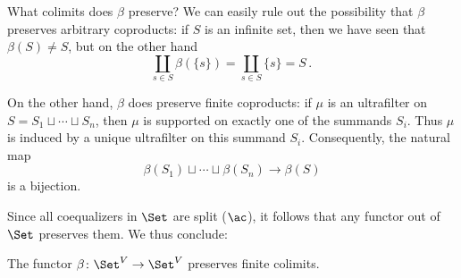 \begin{nul}
	What colimits does $ \beta $ preserve?
	We can easily rule out the possibility that
	$ \beta $ preserves arbitrary coproducts:
	if $ S $ is an infinite set, then
	we have seen that $ \beta(S) \neq S $, but
	on the other hand
	\[
		\coprod_{s \in S} \beta(\{s\}) =
		\coprod_{s \in S} \{s\} = S \period
	\]

	On the other hand, $ \beta $ does preserve finite coproducts:
	if $ \mu $ is an ultrafilter on
	$ S = S_1 \sqcup \cdots \sqcup S_n $,
	then $ \mu $ is supported on
	exactly one of the summands $ S_i $.
	Thus $ \mu $ is induced by a unique ultrafilter
	on this summand $ S_i $.
	Consequently, the natural map
	\[
		\beta(S_1) \sqcup \cdots \sqcup \beta(S_n) \to \beta(S)
	\]
	is a bijection.

	Since all coequalizers in $ \Set $ are split ($ \ac $),
	it follows that any functor out of $ \Set $ preserves them.
	We thus conclude:
\end{nul}

\begin{proposition}%
	\label{prp:betapreservesfinitecolimits}
	The functor $ \beta \colon \Set^V \to \Set^V $
	preserves finite colimits.
\end{proposition}

